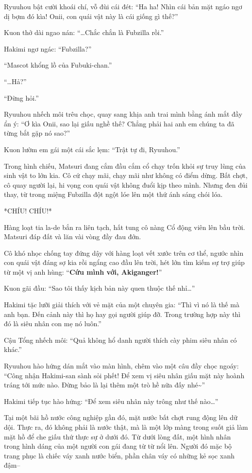 \documentclass[../main.tex]{subfiles}
\begin{document}
Ryuuhou bật cười khoái chí, vỗ đùi cái đét: ``Ha ha! Nhìn cái bản mặt ngáo ngơ dị bợm đó kìa! Onii, con quái vật này là cái giống gì thế?''

Kuon thở dài ngao nán: ``\dots Chắc chắn là Fubzilla rồi.''

Hakimi ngơ ngác: ``Fubzilla?''

``Mascot khổng lồ của Fubuki-chan.''

``\dots Hả?''

``Đừng hỏi.''

Ryuuhou nhếch môi trêu chọc, quay sang khịa anh trai mình bằng ánh mắt đầy ẩn ý: ``Ơ kìa Onii, sao lại giấu nghề thế? Chẳng phải hai anh em chúng ta đã từng bắt gặp nó sao?''

Kuon lườm em gái một cái sắc lẹm: ``Trật tự đi, Ryuuhou.''

Trong hình chiếu, Matsuri đang cắm đầu cắm cổ chạy trốn khỏi sự truy lùng của sinh vật to lớn kia. Cô cứ chạy mãi, chạy mãi như không có điểm dừng. Bất chợt, cô quay người lại, hi vọng con quái vật không đuổi kịp theo mình. Nhưng đen đủi thay, từ trong miệng Fubzilla đột ngột lóe lên một thứ ánh sáng chói lóa.

*CHÍU! CHÍU!*

Hàng loạt tia la-de bắn ra liên tạch, hất tung cô nàng Cổ động viên lên bầu trời. Matsuri đáp đất và lăn vài vòng đầy đau đớn.


Cô khó nhọc chống tay đứng dậy với hàng loạt vết xước trên cơ thể, ngước nhìn con quái vật đáng sợ kia rồi ngẩng cao đầu lên trời, hét lớn tìm kiếm sự trợ giúp từ một vị anh hùng: ``\textbf{Cứu mình với, Akiganger!}''

Kuon gãi đầu: ``Sao tôi thấy kịch bản này quen thuộc thế nhỉ\dots''

Hakimi tặc lưỡi giải thích với vẻ mặt của một chuyên gia: ``Thì vì nó là thế mà anh bạn. Đến cảnh này thì họ hay gọi người giúp đỡ. Trong trường hợp này thì đó là siêu nhân con mẹ nó luôn.''

Cậu Tổng nhếch môi: ``Quả không hổ danh người thích cày phim siêu nhân có khác.''

Ryuuhou hào hứng dán mắt vào màn hình, chêm vào một câu đầy chọc ngoáy: ``Công nhận Hakimi-san sành sỏi phết! Để xem vị siêu nhân giấu mặt này hoành tráng tới mức nào. Đừng bảo là lại thêm một trò hề nữa đấy nhé\~{}''

Hakimi tiếp tục hào hứng: ``Để xem siêu nhân này trông như thế nào\dots''

Tại một bãi hồ nước công nghiệp gần đó, mặt nước bất chợt rung động lên dữ dội. Thực ra, đó không phải là nước thật, mà là một lớp màng trong suốt giả làm mặt hồ để che giấu thứ thực sự ở dưới đó. Từ dưới lòng đất, một hình nhân trong hình dáng của một người con gái đang từ từ nổi lên. Người đó mặc bộ trang phục là chiếc váy xanh nước biển, phần chân váy có những kẻ sọc xanh đậm--
\end{document}
